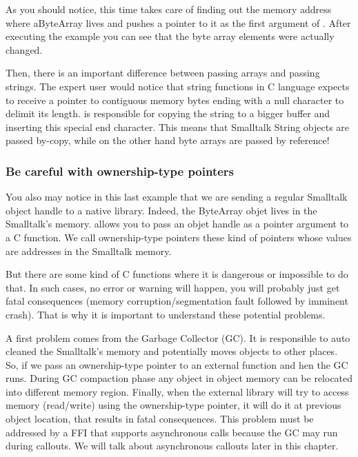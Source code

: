 \documentclass[a4paper,10pt,twoside]{book}
\begin{document}
As you should notice, this time \NativeBoost takes care of finding out the memory address where aByteArray lives and pushes a pointer to it as the first argument of . After executing the example you can see that the byte array elements were actually changed. 

Then, there is an important difference between passing arrays and passing strings. The expert user would notice that string functions in C language expects to receive a pointer to contiguous memory bytes ending with a null character to delimit its length.  \NativeBoost is responsible for copying the string to a bigger buffer and inserting this special end character. This means that Smalltalk String objects are passed by-copy, while on the other hand byte arrays are passed by reference!


\subsubsection{Be careful with ownership-type pointers} 

You also may notice in this last example that we are sending a regular Smalltalk object handle to a native library. 
Indeed, the ByteArray objet lives in the Smalltalk's memory.
\NativeBoost allows you to pass an objet handle as a pointer argument to a C function. 
We call ownership-type pointers these kind of pointers whose values are addresses in the Smalltalk memory.

But there are some kind of C functions where it is dangerous or impossible to do that.
In such cases, no error or warning will happen, you will probably just get fatal consequences (memory corruption/segmentation fault followed by imminent crash).
That is why it is important to understand these potential problems.

A first problem comes from the Garbage Collector (GC). 
It is responsible to auto cleaned the Smalltalk's memory and potentially moves objects to other places.
So, if we pass an ownership-type pointer to an external function and hen the GC runs.
During GC compaction phase any object in object memory can be relocated into different memory region.
Finally, when the external library will try to access memory (read/write) using the ownership-type pointer, it will do it at previous object location, that results in fatal consequences.
This problem must be addressed by a FFI that supports asynchronous calls because the GC may run during callouts.
We will talk about asynchronous callouts later in this chapter.
\end{document}
